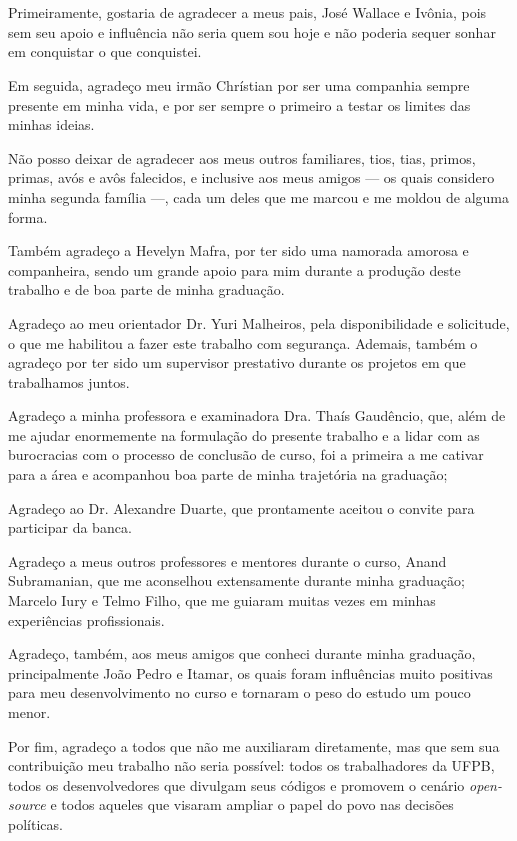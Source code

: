 \section*{} 
Primeiramente, gostaria de agradecer a meus pais, José Wallace e Ivônia, pois sem seu apoio e influência não seria quem sou hoje e não poderia sequer sonhar em conquistar o que conquistei.

Em seguida, agradeço meu irmão Chrístian por ser uma companhia sempre presente em minha vida, e por ser sempre o primeiro a testar os limites das minhas ideias.

Não posso deixar de agradecer aos meus outros familiares, tios, tias, primos, primas, avós e avôs falecidos, e inclusive aos meus amigos — os quais considero minha segunda família —, cada um deles que me marcou e me moldou de alguma forma.

Também agradeço a Hevelyn Mafra, por ter sido uma namorada amorosa e companheira, sendo um grande apoio para mim durante a produção deste trabalho e de boa parte de minha graduação.

Agradeço ao meu orientador Dr. Yuri Malheiros, pela disponibilidade e solicitude, o que me habilitou a fazer este trabalho com segurança. Ademais, também o agradeço por ter sido um supervisor prestativo durante os projetos em que trabalhamos juntos.

Agradeço a minha professora e examinadora Dra. Thaís Gaudêncio, que, além de me ajudar enormemente na formulação do presente trabalho e a lidar com as burocracias com o processo de conclusão de curso, foi a primeira a me cativar para a área e acompanhou boa parte de minha trajetória na graduação;

Agradeço ao Dr. Alexandre Duarte, que prontamente aceitou o convite para participar da banca.

Agradeço a meus outros professores e mentores durante o curso, Anand Subramanian, que me aconselhou extensamente durante minha graduação; Marcelo Iury e Telmo Filho, que me guiaram muitas vezes em minhas experiências profissionais.

Agradeço, também, aos meus amigos que conheci durante minha graduação, principalmente João Pedro e Itamar, os quais foram influências muito positivas para meu desenvolvimento no curso e tornaram o peso do estudo um pouco menor.

Por fim, agradeço a todos que não me auxiliaram diretamente, mas que sem sua contribuição meu trabalho não seria possível: todos os trabalhadores da UFPB, todos os desenvolvedores que divulgam seus códigos e promovem o cenário \textit{open-source} e todos aqueles que visaram ampliar o papel do povo nas decisões políticas.